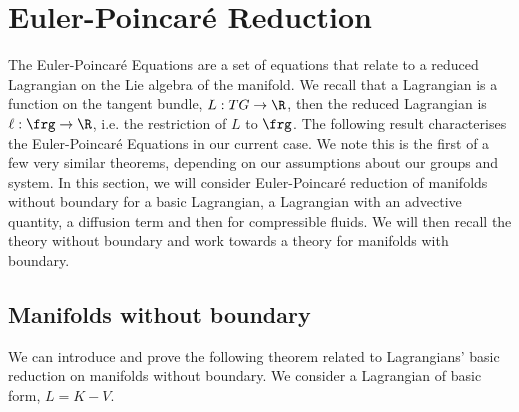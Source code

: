 

\section{Euler-Poincar\'e Reduction}
The Euler-Poincar\'e Equations are a set of equations that relate to a reduced Lagrangian on the Lie algebra of the manifold. We recall that a Lagrangian is a function on the tangent bundle, $L : TG \to \R$, then the reduced Lagrangian is $\ell : \frg \to \R$, i.e. the restriction of $L$ to $\frg$. The following result characterises the Euler-Poincar\'e Equations in our current case. We note this is the first of a few very similar theorems, depending on our assumptions about our groups and system. In this section, we will consider Euler-Poincar\'e reduction of manifolds without boundary for a basic Lagrangian, a Lagrangian with an advective quantity, a diffusion term and then for compressible fluids. We will then recall the theory without boundary and work towards a theory for manifolds with boundary.

\subsection{Manifolds without boundary}
We can introduce and prove the following theorem related to Lagrangians' basic reduction on manifolds without boundary. We consider a Lagrangian of basic form, $L = K - V$.

